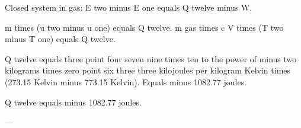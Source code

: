 Closed system in gas:  
E two minus E one equals Q twelve minus W.  

m times (u two minus u one) equals Q twelve.  
m gas times c V times (T two minus T one) equals Q twelve.  

Q twelve equals three point four seven nine times ten to the power of minus two kilograms times zero point six three three kilojoules per kilogram Kelvin times (273.15 Kelvin minus 773.15 Kelvin).  
Equals minus 1082.77 joules.  

Q twelve equals minus 1082.77 joules.  

---